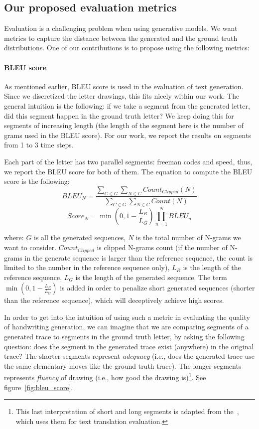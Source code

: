 \subsection{Our proposed evaluation metrics}\label{subsec:eval_metrics}
\par Evaluation is a challenging problem when using generative models. We want metrics to capture the distance between the generated and the ground truth distributions. One of our contributions is to propose using the following metrics:

\paragraph{BLEU score} As mentioned earlier, BLEU score is used in the evaluation of text generation. Since we discretized the letter drawings, this fits nicely within our work. The general intuition is the following: if we take a segment from the generated letter, did this segment happen in the ground truth letter? We keep doing this for segments of increasing length (the length of the segment here is the number of grams used in the BLEU score). For our work, we report the results on segments from 1 to 3 time steps.

Each part of the letter has two parallel segments: freeman codes and speed, thus, we report the BLEU score for both of them.
The equation to compute the BLEU score is the following:
\begin{equation}
BLEU_{N} = \frac{\sum_{C\in G}\sum_{N\in C}Count_{Clipped}(N)}{\sum_{C\in G}\sum_{N\in C}Count(N)}
\end{equation}
\begin{equation}
Score_{N} = \min{(0, 1 - \frac{L_{R}}{L_{G}})} \prod^{N}_{n=1}BLEU_{n}
\end{equation}

where: $G$ is all the generated sequences, $N$ is the total number of N-grams we want to consider. $Count_{Clipped}$ is clipped N-grams count (if the number of N-grams in the generate sequence is larger than the reference sequence, the count is limited to the number in the reference sequence only), $L_R$ is the length of the reference sequence, $L_G$ is the length of the generated sequence.
The term $\min(0, 1 - \frac{L_{R}}{L_{G}})$ is added in order to penalize short generated sequences (shorter than the reference sequence), which will deceptively achieve high scores.

\par In order to get into the intuition of using such a metric in evaluating the quality of handwriting generation, we can imagine that we are comparing segments of a generated trace to segments in the ground truth letter, by asking the following question: does the segment in the generated trace exist (anywhere) in the original trace? The shorter segments represent \textit{adequacy} (i.e., does the generated trace use the same elementary moves like the ground truth trace). The longer segments represents \textit{fluency} of drawing (i.e., how good the drawing is)\footnote{This last interpretation of short and long segments is adapted from the~\citep{papineni2002bleu}, which uses them for text translation evaluation.}. See figure~\ref{fig:bleu_score}.

